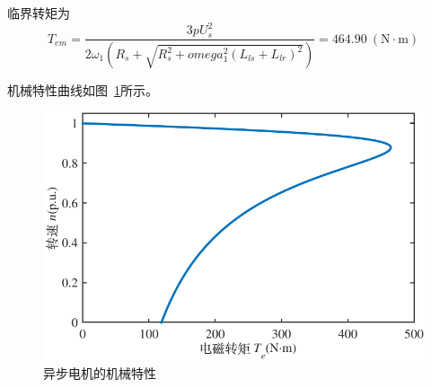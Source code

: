 \documentclass[12pt, a4paper, UTF8, fontset=adobe, oneside]{ctexbook} %
\begin{document}
临界转矩为
\begin{equation}
T_{em}=\dfrac{3pU_s^2}{2\omega_1(R_s+\sqrt{R_s^2+omega_1^2(L_{ls}+L_{lr})^2})} = 464.90\ (\mathrm{N·m})
\end{equation}

机械特性曲线如图~\ref{Fig:MechCurve}所示。

\begin{figure}[htbp]
\centering
\includegraphics[width=12.557cm]{Fig_T_s.pdf} %
\caption{异步电机的机械特性}\label{Fig:MechCurve}
\end{figure}



\end{document}
